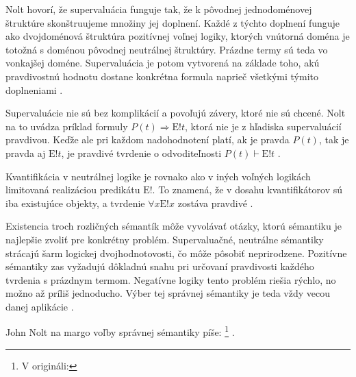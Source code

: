 \documentclass[12pt, letterpaper]{article}
\begin{document}
Nolt hovorí, že supervaluácia funguje tak, že k pôvodnej jednodoménovej štruktúre skonštruujeme množiny jej doplnení. Každé z týchto doplnení funguje ako dvojdoménová štruktúra pozitívnej voľnej logiky, ktorých vnútorná doména je totožná s doménou pôvodnej neutrálnej štruktúry. Prázdne termy sú teda vo vonkajšej doméne. Supervaluácia je potom vytvorená na základe toho, akú pravdivostnú hodnotu dostane konkrétna formula naprieč všetkými týmito doplneniami \parencites[]{sep-logic-free}.\par
Supervaluácie nie sú bez komplikácií a povoľujú závery, ktoré nie sú chcené. Nolt na to uvádza príklad formuly $P(t) \Rightarrow \text{E}!t$, ktorá nie je z hľadiska supervaluácií pravdivou. Keďže ale pri každom nadohodnotení platí, ak je pravda $P(t)$, tak je pravda aj $\text{E}!t$, je pravdivé tvrdenie o odvoditeľnosti $P(t) \vdash \text{E}!t$ \parencites[]{sep-logic-free}.\par
Kvantifikácia v neutrálnej logike je rovnako ako v iných voľných logikách limitovaná realizáciou predikátu $\text{E}!$. To znamená, že v dosahu kvantifikátorov sú iba existujúce objekty, a tvrdenie $\forall x \text{E}!x$ zostáva pravdivé \parencites[519, 522]{Pavlovic2023}.\par 
Existencia troch rozličných sémantík môže vyvolávať otázky, ktorú sémantiku je najlepšie zvoliť pre konkrétny problém. Supervaluačné, neutrálne sémantiky strácajú šarm logickej dvojhodnotovosti, čo môže pôsobiť neprirodzene. Pozitívne sémantiky zas vyžadujú dôkladnú snahu pri určovaní pravdivosti každého tvrdenia s prázdnym termom. Negatívne logiky tento problém riešia rýchlo, no možno až príliš jednoducho. Výber tej správnej sémantiky je teda vždy vecou danej aplikácie \parencites[1038--1039]{Nolt2007}.\par 
John Nolt na margo voľby správnej sémantiky píše: \footnote{V origináli: } \parencites[vlastný preklad,][1039]{Nolt2007}.\par 
\end{document}
